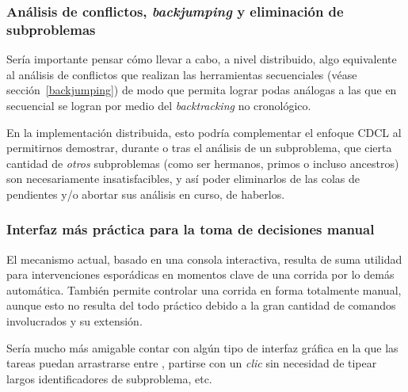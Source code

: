 \subsubsection{Análisis de conflictos, \emph{backjumping} y eliminación de subproblemas}

Sería importante pensar cómo llevar a cabo, a nivel distribuido, algo
equivalente al análisis de conflictos que realizan las herramientas
secuenciales (véase sección~\ref{backjumping}) de modo que permita lograr
podas análogas a las que en secuencial se logran por medio del
\emph{backtracking} no cronológico.

En la implementación distribuida, esto podría complementar el enfoque CDCL al
permitirnos demostrar, durante o tras el análisis de un subproblema, que
cierta cantidad de \emph{otros} subproblemas (como ser hermanos, primos o
incluso ancestros) son necesariamente insatisfacibles, y así poder eliminarlos
de las colas de pendientes y/o abortar sus análisis en curso, de haberlos.


\subsubsection{Interfaz más práctica para la toma de decisiones manual}

El mecanismo actual, basado en una consola interactiva, resulta de suma
utilidad para intervenciones esporádicas en momentos clave de una corrida por
lo demás automática. También permite controlar una corrida en forma totalmente
manual, aunque esto no resulta del todo práctico debido a la gran cantidad de
comandos involucrados y su extensión.

Sería mucho más amigable contar con algún tipo de interfaz gráfica en la que
las tareas puedan arrastrarse entre \ws, partirse con un \emph{clic} sin
necesidad de tipear largos identificadores de subproblema, etc.




